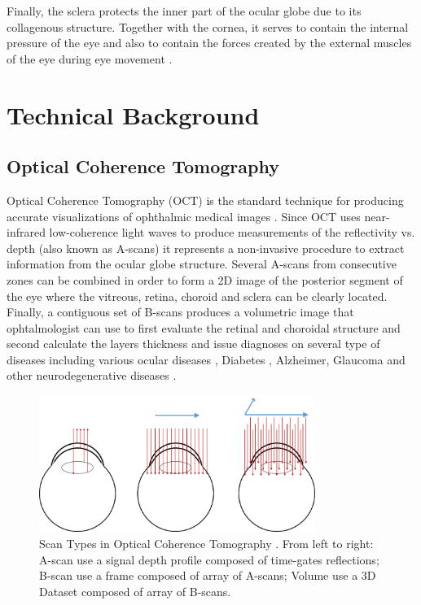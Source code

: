 \documentclass[12pt,a4paper]{scrartcl}
\begin{document}
Finally, the sclera protects the inner part of the ocular globe due to its collagenous structure. Together with the cornea, it serves to contain the internal pressure of the eye and also to contain the forces created by the external muscles of the eye during eye movement \cite{Meek2008}.

\section{Technical Background}\label{s:TechBack}


\subsection{Optical Coherence Tomography}
Optical Coherence Tomography (OCT) is the standard technique for producing accurate visualizations of ophthalmic medical images \cite{Garrido2014}. Since OCT uses near-infrared low-coherence light waves to produce measurements of the reflectivity vs. depth (also known as A-scans\cite{Garrido2014}) it represents a non-invasive procedure to extract information from the ocular globe structure. Several A-scans from consecutive zones can be combined in order to form a 2D image of the posterior segment of the eye where the vitreous, retina, choroid and sclera can be clearly located. Finally, a contiguous set of B-scans produces a volumetric image that ophtalmologist can use to first evaluate the retinal and choroidal structure and second calculate the layers thickness and issue diagnoses on several type of diseases including various ocular diseases \cite{Ronchetti2019}, Diabetes \cite{Jiang2018}, Alzheimer, Glaucoma and other neurodegenerative diseases \cite{DENHAAN2017162}.   


\begin{figure}[H]
    \centering
    \includegraphics[width=0.8\textwidth]{./images/csm_ABC_scans.png}
    \caption{Scan Types in Optical Coherence Tomography \cite{Willdeman2016}. From left to right: A-scan use a signal depth profile composed of time-gates reflections; B-scan use a frame composed of array of A-scans; Volume use a 3D Dataset composed of array of B-scans.}
    \label{fig:mb-oct-abcscans}
\end{figure}
\end{document}
